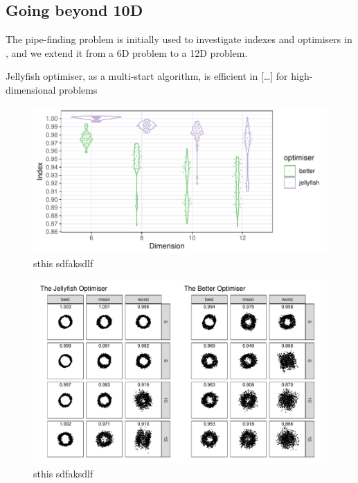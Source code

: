 \documentclass[
  number,
  preprint,
  3p]{elsarticle}
\begin{document}
\hypertarget{going-beyond-10d}{%
\subsection{Going beyond 10D}\label{going-beyond-10d}}

The pipe-finding problem is initially used to investigate indexes and
optimisers in \citet{laa_using_2020}, and we extend it from a 6D problem
to a 12D problem.

Jellyfish optimiser, as a multi-start algorithm, is efficient in
{[}\ldots{]} for high-dimensional problems

\begin{figure}

{\centering \includegraphics{optim_files/figure-pdf/unnamed-chunk-2-1.pdf}

}

\caption{sthis sdfaksdlf}

\end{figure}

\begin{figure}

{\centering \includegraphics{optim_files/figure-pdf/unnamed-chunk-3-1.pdf}

}

\caption{sthis sdfaksdlf}

\end{figure}
\end{document}
